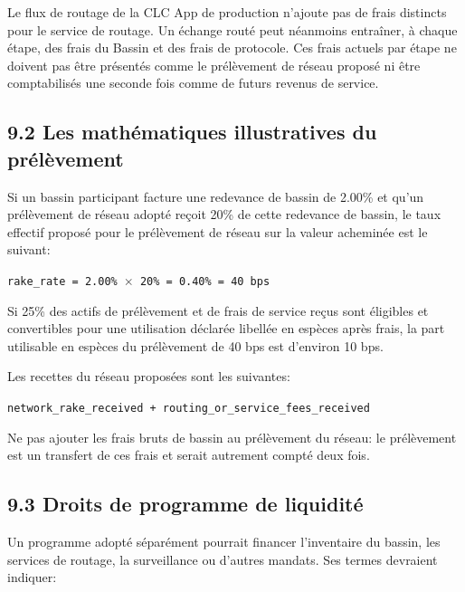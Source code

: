 \documentclass[11pt]{article}
\begin{document}
Le flux de routage de la CLC App de production n'ajoute pas de frais distincts pour le service de routage. Un échange routé peut néanmoins entraîner, à chaque étape, des frais du Bassin et des frais de protocole. Ces frais actuels par étape ne doivent pas être présentés comme le prélèvement de réseau proposé ni être comptabilisés une seconde fois comme de futurs revenus de service.

\subsection*{9.2 Les mathématiques illustratives du prélèvement}

Si un bassin participant facture une redevance de bassin de 2.00\% et qu'un prélèvement de réseau adopté reçoit 20\% de cette redevance de bassin, le taux effectif proposé pour le prélèvement de réseau sur la valeur acheminée est le suivant:

\texttt{rake\_rate = 2.00\% $\times$ 20\% = 0.40\% = 40 bps}

Si 25\% des actifs de prélèvement et de frais de service reçus sont éligibles et convertibles pour une utilisation déclarée libellée en espèces après frais, la part utilisable en espèces du prélèvement de 40 bps est d'environ 10 bps.

Les recettes du réseau proposées sont les suivantes:

\texttt{network\_rake\_received + routing\_or\_service\_fees\_received}

Ne pas ajouter les frais bruts de bassin au prélèvement du réseau: le prélèvement est un transfert de ces frais et serait autrement compté deux fois.

\subsection*{9.3 Droits de programme de liquidité}

Un programme adopté séparément pourrait financer l'inventaire du bassin, les services de routage, la surveillance ou d'autres mandats. Ses termes devraient indiquer:
\end{document}
